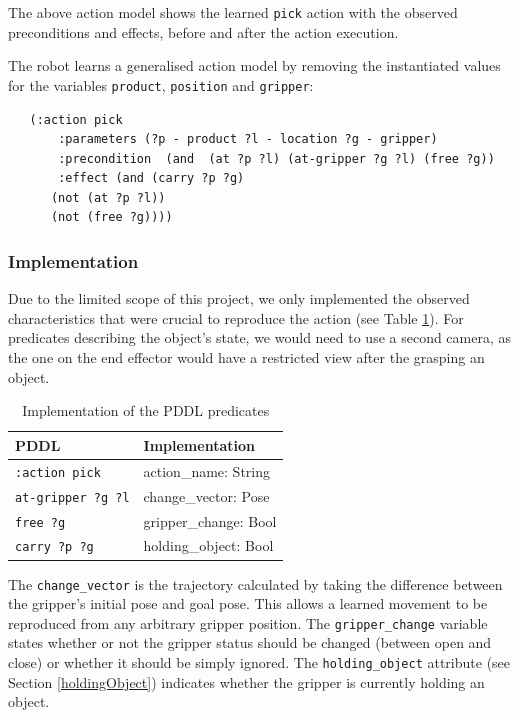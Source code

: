 The above action model shows the learned \texttt{pick} action with the observed preconditions and effects, before and after the action execution.

The robot learns a generalised action model by removing the instantiated values for the variables \texttt{product}, \texttt{position} and \texttt{gripper}:

\begin{verbatim}
   (:action pick
       :parameters (?p - product ?l - location ?g - gripper)
       :precondition  (and  (at ?p ?l) (at-gripper ?g ?l) (free ?g))
       :effect (and (carry ?p ?g)
      (not (at ?p ?l)) 
      (not (free ?g))))
\end{verbatim}

\subsubsection{Implementation}
Due to the limited scope of this project, we only implemented the observed characteristics that were crucial to reproduce the action (see Table \ref{tab:PDDL implementation}).
For predicates describing the object's state, we would need to use a second camera, as the one on the end effector would have a restricted view after the grasping an object.

\begin{table}[h]
\begin{center}
\begin{tabular}{l|l}
PDDL & Implementation\\ \hline
\texttt{:action pick} & action_name: String\\
\texttt{at-gripper ?g ?l} & change_vector: Pose\\
\texttt{free ?g } & gripper_change: Bool\\
\texttt{carry ?p ?g} & holding_object: Bool
\end{tabular}
\label{tab:PDDL implementation}
\caption{Implementation of the PDDL predicates}
\end{center}
\end{table}

The \texttt{change_vector} is the trajectory calculated by taking the difference between the gripper's initial pose and goal pose.
This allows a learned movement to be reproduced from any arbitrary gripper position.
The \texttt{gripper_change} variable states whether or not the gripper status should be changed (between open and close) or whether it should be simply ignored.
The \texttt{holding_object} attribute (see Section \ref{holdingObject}) indicates whether the gripper is currently holding an object.

